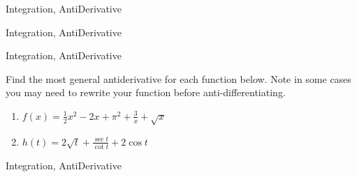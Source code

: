 \begin{tagblock}{Integration, AntiDerivative}
\begin{question}
	
\begin{tags}
	    Integration, AntiDerivative
\end{tags}
	
\begin{diary}
	   
\end{diary}
	
\begin{solution}
	   
	    \end{enumerate}
\end{solution}
	
\end{question}

\end{tagblock}


\begin{tagblock}{Integration, AntiDerivative}
\begin{question}

Find the most general antiderivative for each function below.  Note in some cases you may need to rewrite your function before anti-differentiating.  
\begin{enumerate}
\item $\displaystyle{f(x)= \frac{1}{2} x^2 - 2 x+\pi^2 +\frac{3}{x} + \sqrt{x}}$
\vspace{1in}
\item $\displaystyle{h(t)=2\sqrt{t} + \frac{\sec t}{\cot t} + 2 \cos t}$
\vspace{1in}
\end{enumerate}
	
	
\begin{tags}
	    Integration, AntiDerivative
\end{tags}
	
\begin{diary}
	   
\end{diary}
	
\begin{solution}
	   
	    \end{enumerate}
\end{solution}
	
\end{question}

\end{tagblock}


